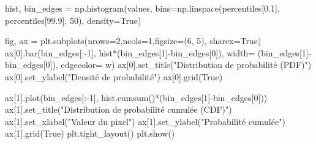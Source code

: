 \documentclass[
  11pt,
  letterpaper,
  open=any,
  twoside=false,
  french]{scrbook}
\newenvironment{Shaded}{\begin{snugshade}}{\end{snugshade}}
\newcommand{\DecValTok}[1]{\textcolor[rgb]{0.68,0.00,0.00}{#1}}
\newcommand{\FloatTok}[1]{\textcolor[rgb]{0.68,0.00,0.00}{#1}}
\newcommand{\NormalTok}[1]{\textcolor[rgb]{0.00,0.23,0.31}{#1}}
\newcommand{\OperatorTok}[1]{\textcolor[rgb]{0.37,0.37,0.37}{#1}}
\newcommand{\StringTok}[1]{\textcolor[rgb]{0.13,0.47,0.30}{#1}}
\newcommand{\VariableTok}[1]{\textcolor[rgb]{0.07,0.07,0.07}{#1}}
\begin{document}
\begin{Shaded}
\begin{Highlighting}[]
\NormalTok{hist, bin\_edges }\OperatorTok{=}\NormalTok{ np.histogram(values, }
\NormalTok{                                bins}\OperatorTok{=}\NormalTok{np.linspace(percentiles[}\FloatTok{0.1}\NormalTok{], }
\NormalTok{                                percentiles[}\FloatTok{99.9}\NormalTok{], }\DecValTok{50}\NormalTok{), }
\NormalTok{                                density}\OperatorTok{=}\VariableTok{True}\NormalTok{)}

\NormalTok{fig, ax }\OperatorTok{=}\NormalTok{ plt.subplots(nrows}\OperatorTok{=}\DecValTok{2}\NormalTok{,ncols}\OperatorTok{=}\DecValTok{1}\NormalTok{,figsize}\OperatorTok{=}\NormalTok{(}\DecValTok{6}\NormalTok{, }\DecValTok{5}\NormalTok{), sharex}\OperatorTok{=}\VariableTok{True}\NormalTok{)}
\NormalTok{ax[}\DecValTok{0}\NormalTok{].bar(bin\_edges[:}\OperatorTok{{-}}\DecValTok{1}\NormalTok{], }
\NormalTok{                hist}\OperatorTok{*}\NormalTok{(bin\_edges[}\DecValTok{1}\NormalTok{]}\OperatorTok{{-}}\NormalTok{bin\_edges[}\DecValTok{0}\NormalTok{]), }
\NormalTok{                width}\OperatorTok{=}\NormalTok{ (bin\_edges[}\DecValTok{1}\NormalTok{]}\OperatorTok{{-}}\NormalTok{bin\_edges[}\DecValTok{0}\NormalTok{]), }
\NormalTok{                edgecolor}\OperatorTok{=} \StringTok{\textquotesingle{}w\textquotesingle{}}\NormalTok{)}
\NormalTok{ax[}\DecValTok{0}\NormalTok{].set\_title(}\StringTok{"Distribution de probabilité (PDF)"}\NormalTok{)}
\NormalTok{ax[}\DecValTok{0}\NormalTok{].set\_ylabel(}\StringTok{"Densité de probabilité"}\NormalTok{)}
\NormalTok{ax[}\DecValTok{0}\NormalTok{].grid(}\VariableTok{True}\NormalTok{)}

\NormalTok{ax[}\DecValTok{1}\NormalTok{].plot(bin\_edges[:}\OperatorTok{{-}}\DecValTok{1}\NormalTok{], }
\NormalTok{            hist.cumsum()}\OperatorTok{*}\NormalTok{(bin\_edges[}\DecValTok{1}\NormalTok{]}\OperatorTok{{-}}\NormalTok{bin\_edges[}\DecValTok{0}\NormalTok{]))}
\NormalTok{ax[}\DecValTok{1}\NormalTok{].set\_title(}\StringTok{"Distribution de probabilité cumulée (CDF)"}\NormalTok{)}
\NormalTok{ax[}\DecValTok{1}\NormalTok{].set\_xlabel(}\StringTok{"Valeur du pixel"}\NormalTok{)}
\NormalTok{ax[}\DecValTok{1}\NormalTok{].set\_ylabel(}\StringTok{"Probabilité cumulée"}\NormalTok{)}
\NormalTok{ax[}\DecValTok{1}\NormalTok{].grid(}\VariableTok{True}\NormalTok{)}
\NormalTok{plt.tight\_layout()}
\NormalTok{plt.show()                              }
\end{Highlighting}
\end{Shaded}
\end{document}
